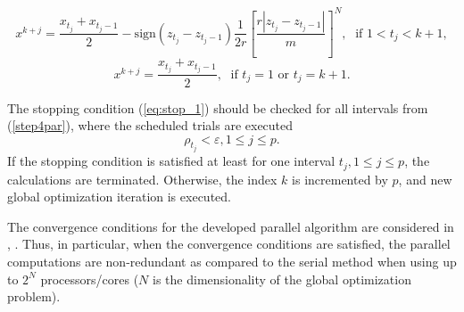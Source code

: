 \documentclass{aims}
\theoremstyle{definition}
\begin{document}
\begin{equation} \label{step5par}
x^{k+j}=\frac{x_{t_j}+x_{t_j-1}}{2}-\mathrm{sign}(z_{t_j}-z_{t_j-1})\frac{1}{2r}\left[\frac{r|z_{t_j}-z_{t_j-1}|}{m}\right]^N,\; \textrm{ if } 1<t_j<k+1,
\end{equation}
\[
x^{k+j}=\frac{x_{t_j}+x_{t_j-1}}{2},\; \textrm{ if } t_j=1 \textrm{ or } t_j=k+1.
\]
\par
The stopping condition (\ref{eq:stop_1}) should be checked for all intervals from (\ref{step4par}),
where the scheduled trials are executed
\begin{equation}
  \label{eq:stop}
\rho_{t_j}<\varepsilon,1\leq j\leq p.
\end{equation}
If the stopping condition is satisfied at least for one interval \(t_j, 1\le j\le p\), the calculations
are terminated. Otherwise, the index \(k\) is incremented by \(p\), and new global optimization iteration is executed.
\par
The convergence conditions for the developed parallel algorithm are considered
in \cite{stronginGergelBarkalovParGO}, \cite{strSergGO}. Thus, in particular, when the convergence conditions are
satisfied, the parallel computations are non-redundant as compared to the serial method
when using up to \(2^N\) processors/cores (\(N\) is the dimensionality of the global optimization problem).
\end{document}
